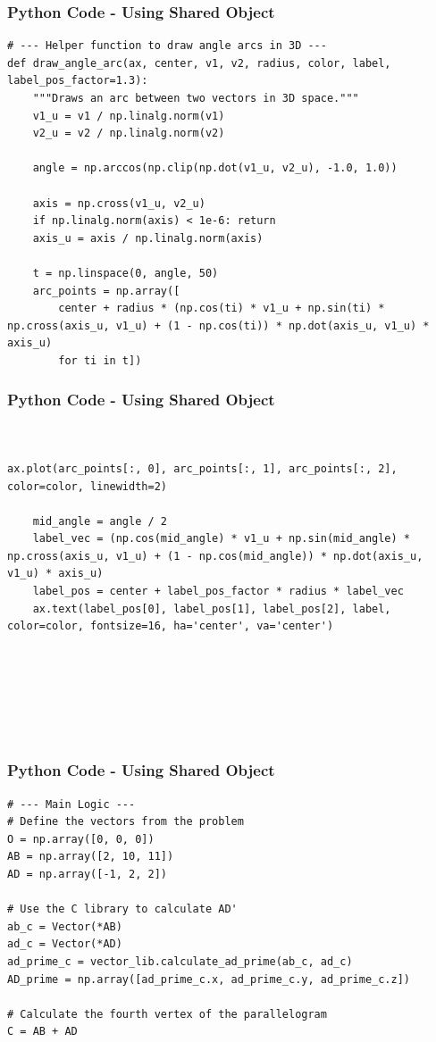 \documentclass{beamer}
\begin{document}
\begin{frame}[fragile]
    \frametitle{Python Code - Using Shared Object}
    \begin{lstlisting}
# --- Helper function to draw angle arcs in 3D ---
def draw_angle_arc(ax, center, v1, v2, radius, color, label, label_pos_factor=1.3):
    """Draws an arc between two vectors in 3D space."""
    v1_u = v1 / np.linalg.norm(v1)
    v2_u = v2 / np.linalg.norm(v2)
    
    angle = np.arccos(np.clip(np.dot(v1_u, v2_u), -1.0, 1.0))
    
    axis = np.cross(v1_u, v2_u)
    if np.linalg.norm(axis) < 1e-6: return
    axis_u = axis / np.linalg.norm(axis)
    
    t = np.linspace(0, angle, 50)
    arc_points = np.array([
        center + radius * (np.cos(ti) * v1_u + np.sin(ti) * np.cross(axis_u, v1_u) + (1 - np.cos(ti)) * np.dot(axis_u, v1_u) * axis_u)
        for ti in t])
\end{lstlisting}
\end{frame}
\begin{frame}[fragile]
    \frametitle{Python Code - Using Shared Object}
    \begin{lstlisting}


ax.plot(arc_points[:, 0], arc_points[:, 1], arc_points[:, 2], color=color, linewidth=2)
    
    mid_angle = angle / 2
    label_vec = (np.cos(mid_angle) * v1_u + np.sin(mid_angle) * np.cross(axis_u, v1_u) + (1 - np.cos(mid_angle)) * np.dot(axis_u, v1_u) * axis_u)
    label_pos = center + label_pos_factor * radius * label_vec
    ax.text(label_pos[0], label_pos[1], label_pos[2], label, color=color, fontsize=16, ha='center', va='center')







\end{lstlisting}
\end{frame}

\begin{frame}[fragile]
     \frametitle{Python Code - Using Shared Object}
     \begin{lstlisting}
# --- Main Logic ---
# Define the vectors from the problem
O = np.array([0, 0, 0])
AB = np.array([2, 10, 11])
AD = np.array([-1, 2, 2])

# Use the C library to calculate AD'
ab_c = Vector(*AB)
ad_c = Vector(*AD)
ad_prime_c = vector_lib.calculate_ad_prime(ab_c, ad_c)
AD_prime = np.array([ad_prime_c.x, ad_prime_c.y, ad_prime_c.z])

# Calculate the fourth vertex of the parallelogram
C = AB + AD



     \end{lstlisting}
     \end{frame}
\end{document}

